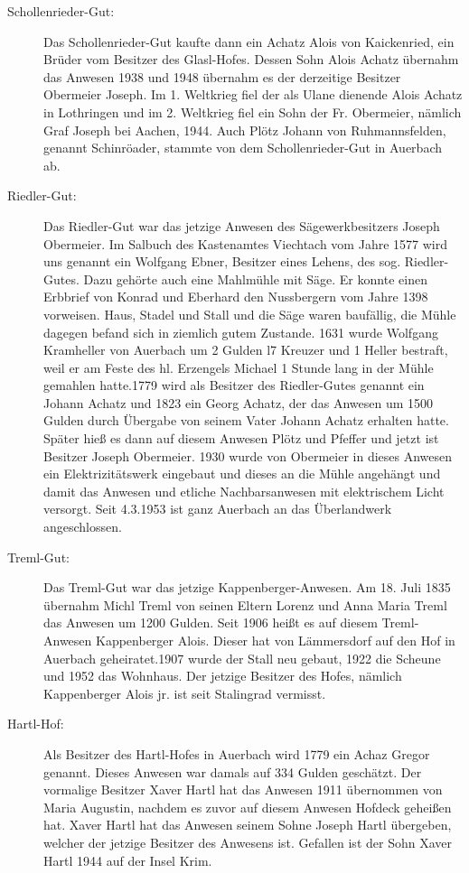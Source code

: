 \documentclass[12pt,a4pager]{book}
\begin{document}
\begin{description}
\item[Schollenrieder-Gut:] Das Schollenrieder-Gut kaufte dann ein Achatz Alois
von Kaickenried, ein Brüder vom Besitzer des Glasl-Hofes. Dessen Sohn Alois
Achatz übernahm das Anwesen 1938 und 1948 übernahm es der derzeitige Besitzer
Obermeier Joseph. Im 1. Weltkrieg fiel der als Ulane dienende Alois Achatz in
Lothringen und im 2. Weltkrieg fiel ein Sohn der Fr. Obermeier, nämlich Graf
Joseph bei Aachen, 1944. Auch Plötz Johann von Ruhmannsfelden, genannt
Schinröader, stammte von dem Schollenrieder-Gut in Auerbach ab.

\item[Riedler-Gut:] Das Riedler-Gut war das jetzige Anwesen des
Sägewerkbesitzers Joseph Obermeier. Im Salbuch des Kastenamtes Viechtach vom
Jahre 1577 wird uns genannt ein Wolfgang Ebner, Besitzer eines Lehens, des sog.
Riedler-Gutes. Dazu gehörte auch eine Mahlmühle mit Säge. Er konnte einen
Erbbrief von Konrad und Eberhard den Nussbergern vom Jahre 1398 vorweisen. Haus,
Stadel und Stall und die Säge waren baufällig, die Mühle dagegen befand sich in
ziemlich gutem Zustande. 1631 wurde Wolfgang Kramheller von Auerbach um 2 Gulden
l7 Kreuzer und 1 Heller bestraft, weil er am Feste des hl. Erzengels Michael 1
Stunde lang in der Mühle gemahlen hatte.1779 wird als Besitzer des Riedler-Gutes
genannt ein Johann Achatz und 1823 ein Georg Achatz, der das Anwesen um 1500
Gulden durch Übergabe von seinem Vater Johann Achatz erhalten hatte. Später hieß
es dann auf diesem Anwesen Plötz und Pfeffer und jetzt ist Besitzer Joseph
Obermeier. 1930 wurde von Obermeier in dieses Anwesen ein Elektrizitätswerk
eingebaut und dieses an die Mühle angehängt und damit das Anwesen und etliche
Nachbarsanwesen mit elektrischem Licht versorgt. Seit 4.3.1953 ist ganz Auerbach
an das Überlandwerk angeschlossen.

\item[Treml-Gut:] Das Treml-Gut war das jetzige Kappenberger-Anwesen. Am 18.
Juli 1835 übernahm Michl Treml von seinen Eltern Lorenz und Anna Maria Treml das
Anwesen um 1200 Gulden. Seit 1906 heißt es auf diesem Treml-Anwesen Kappenberger
Alois. Dieser hat von Lämmersdorf auf den Hof in Auerbach geheiratet.1907 wurde
der Stall neu gebaut, 1922 die Scheune und 1952 das Wohnhaus. Der jetzige
Besitzer des Hofes, nämlich Kappenberger Alois jr. ist seit Stalingrad vermisst.

\item[Hartl-Hof:] Als Besitzer des Hartl-Hofes in Auerbach wird 1779 ein Achaz
Gregor genannt. Dieses Anwesen war damals auf 334 Gulden geschätzt. Der
vormalige Besitzer Xaver Hartl hat das Anwesen 1911 übernommen von Maria
Augustin, nachdem es zuvor auf diesem Anwesen Hofdeck geheißen hat. Xaver Hartl
hat das Anwesen seinem Sohne Joseph Hartl übergeben, welcher der jetzige
Besitzer des Anwesens ist. Gefallen ist der Sohn Xaver Hartl 1944 auf der Insel
Krim.


\end{description}
\end{document}
